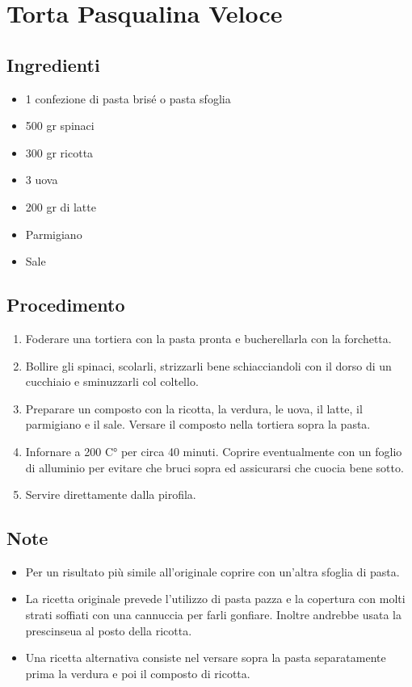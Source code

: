 \section{Torta Pasqualina Veloce}
\subsection{Ingredienti}
\begin{itemize}
\item 1 confezione di pasta brisé o pasta sfoglia  
\item 500 gr spinaci  
\item 300 gr ricotta  
\item 3 uova  
\item 200 gr di latte  
\item Parmigiano  
\item Sale 
\end{itemize}
\subsection{Procedimento}
\begin{enumerate}
\item  Foderare una tortiera con la pasta pronta e bucherellarla con la forchetta.  
\item  Bollire gli spinaci, scolarli, strizzarli bene schiacciandoli con il dorso di un cucchiaio e sminuzzarli col coltello.  
\item  Preparare un composto con la ricotta, la verdura, le uova, il latte, il parmigiano e il sale. Versare il composto nella tortiera sopra la pasta.   
\item  Infornare a 200 C° per circa 40 minuti. Coprire eventualmente con un foglio di alluminio per evitare che bruci sopra ed assicurarsi che cuocia bene sotto.  
\item  Servire direttamente dalla pirofila. 
\end{enumerate}
\subsection{Note}
\begin{itemize}
\item Per un risultato più simile all'originale coprire con un'altra sfoglia di pasta.  
\item La ricetta originale prevede l'utilizzo di pasta pazza e la copertura con molti strati soffiati con una cannuccia per farli gonfiare. Inoltre andrebbe usata la prescinseua al posto della ricotta.  
\item Una ricetta alternativa consiste nel versare sopra la pasta separatamente prima la verdura e poi il composto di ricotta.
\end{itemize}
